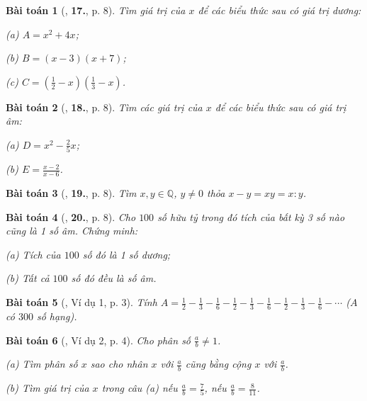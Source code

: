 \documentclass{article}
\numberwithin{equation}{section}
\newtheorem{baitoan}{Bài toán}[section]
\begin{document}
\begin{baitoan}[\cite{Tuyen_Toan_7}, \textbf{17.}, p. 8]
	Tìm giá trị của $x$ để các biểu thức sau có giá trị dương:
	\begin{enumerate*}
		\item[(a)] $A = x^2 + 4x$;
		\item[(b)] $B = (x - 3)(x + 7)$;
		\item[(c)] $C = \left(\frac{1}{2} - x\right)\left(\frac{1}{3} - x\right)$.
	\end{enumerate*}
\end{baitoan}

\begin{baitoan}[\cite{Tuyen_Toan_7}, \textbf{18.}, p. 8]
	Tìm các giá trị của $x$ để các biểu thức sau có giá trị âm:
	\begin{enumerate*}
		\item[(a)] $D = x^2 - \frac{2}{5}x$;
		\item[(b)] $E = \frac{x - 2}{x - 6}$.
	\end{enumerate*}
\end{baitoan}

\begin{baitoan}[\cite{Tuyen_Toan_7}, \textbf{19.}, p. 8]
	Tìm $x,y\in\mathbb{Q}$, $y\ne 0$ thỏa $x - y = xy = x:y$.
\end{baitoan}

\begin{baitoan}[\cite{Tuyen_Toan_7}, \textbf{20.}, p. 8]
	Cho $100$ số hữu tỷ trong đó tích của bất kỳ 3 số nào cũng là 1 số âm. Chứng minh:
	\begin{enumerate*}
		\item[(a)] Tích của $100$ số đó là 1 số dương;
		\item[(b)] Tất cả $100$ số đó đều là số âm.
	\end{enumerate*}
\end{baitoan}

\begin{baitoan}[\cite{Binh_Toan_7_tap_1}, Ví dụ 1, p. 3]
	Tính $A = \frac{1}{2} - \frac{1}{3} - \frac{1}{6} - \frac{1}{2} - \frac{1}{3} - \frac{1}{6} - \frac{1}{2} - \frac{1}{3} - \frac{1}{6} - \cdots$ ($A$ có $300$ số hạng).
\end{baitoan}

\begin{baitoan}[\cite{Binh_Toan_7_tap_1}, Ví dụ 2, p. 4]
	Cho phân số $\frac{a}{b}\ne 1$.
	\begin{enumerate*}
		\item[(a)] Tìm phân số $x$ sao cho nhân $x$ với $\frac{a}{b}$ cũng bằng cộng $x$ với $\frac{a}{b}$.
		\item[(b)] Tìm giá trị của $x$ trong câu (a) nếu $\frac{a}{b} = \frac{7}{5}$, nếu $\frac{a}{b} = \frac{8}{11}$.
	\end{enumerate*}
\end{baitoan}
\end{document}
